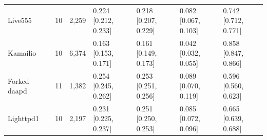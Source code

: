 \begin{table}[t]
\begin{tabularx}{\textwidth}{l r r *{4}{>{\centering\arraybackslash}X}}
Live555 & 10 & 2,259 & \shortstack{0.224\\{[0.212, 0.233]}} & \shortstack{0.218\\{[0.207, 0.229]}} & \shortstack{0.082\\{[0.067, 0.103]}} & \shortstack{0.742\\{[0.712, 0.771]}} \\
Kamailio & 10 & 6,374 & \shortstack{0.163\\{[0.153, 0.171]}} & \shortstack{0.161\\{[0.149, 0.173]}} & \shortstack{0.042\\{[0.032, 0.055]}} & \shortstack{0.858\\{[0.847, 0.866]}} \\
Forked-daapd & 11 & 1,382 & \shortstack{0.254\\{[0.245, 0.262]}} & \shortstack{0.253\\{[0.251, 0.256]}} & \shortstack{0.089\\{[0.070, 0.119]}} & \shortstack{0.596\\{[0.560, 0.623]}} \\
Lighttpd1 & 10 & 2,197 & \shortstack{0.231\\{[0.225, 0.237]}} & \shortstack{0.251\\{[0.250, 0.253]}} & \shortstack{0.085\\{[0.072, 0.096]}} & \shortstack{0.665\\{[0.639, 0.688]}} \\
\bottomrule
\end{tabularx}
\end{table}
